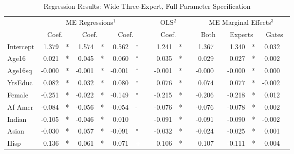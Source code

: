 \documentclass[12pt]{article}
\begin{document}
\begin{landscape}
\begin{table} \centering
  \caption{Regression Results: Wide Three-Expert, Full Parameter Specification}
    \begin{threeparttable}
      \begin{tabular}[l]{l r l r l r l c r l c r l r l r l}

\cmidrule{1-17}
& \multicolumn{6}{c}{ME Regressions$^{1}$} &&  \multicolumn{2}{c}{OLS$^{2}$} && \multicolumn{6}{c}{ME Marginal Effects$^{3}$} \\
\cmidrule(l){2-7}    \cmidrule(l){9-10}     \cmidrule(l){12-17}
& \multicolumn{2}{c}{Coef.} &  \multicolumn{2}{c}{Coef.} &  \multicolumn{2}{c}{Coef.}  && \multicolumn{2}{c}{Coef.} && \multicolumn{2}{c}{Both}    &  \multicolumn{2}{c}{Experts}  &  \multicolumn{2}{c}{Gates} \\
                \cmidrule(l){2-3} \cmidrule(l){4-5} \cmidrule(l){6-7} \cmidrule(l){9-10} \cmidrule(l){12-13} \cmidrule(l){14-15} \cmidrule(l){16-17}
Intercept     &  1.379 & *      &  1.574 & *      &  0.562 & *      &&  1.241 & *     &&  1.367 &          &  1.340 & *        &  0.032 &        \\
Age16           &  0.021 & *      &  0.045 & *      &  0.060 & *      &&  0.035 & *     &&  0.029 &          &  0.027 & *        &  0.002 &        \\
Age16sq         & -0.000 & *      & -0.001 & *      & -0.001 & *      && -0.001 & *     && -0.000 &          & -0.000 & *        &  0.000 &        \\
YrsEduc         &  0.082 & *      &  0.032 & *      &  0.080 & *      &&  0.076 & *     &&  0.074 &          &  0.077 & *        & -0.002 &        \\
Female          & -0.251 & *      & -0.022 & *      & -0.149 & *      && -0.215 & *     && -0.206 &          & -0.218 & *        &  0.012 &        \\
Af Amer         & -0.084 & *      & -0.056 & *      & -0.054 & -      && -0.076 & *     && -0.076 &          & -0.078 & *        &  0.002 &        \\
Indian          & -0.105 & *      & -0.046 & *      &  0.010 &        && -0.091 & *     && -0.091 &          & -0.090 & *        & -0.002 &        \\
Asian           & -0.030 & *      &  0.057 & *      & -0.091 & *      && -0.032 & *     && -0.024 &          & -0.025 & *        &  0.001 &        \\
Hisp            & -0.136 & *      & -0.061 & *      &  0.071 & +      && -0.106 & *     && -0.107 &          & -0.111 & *        &  0.004 &        \\

\end{tabular}
\end{threeparttable}
\end{table}
\end{landscape}
\end{document}
